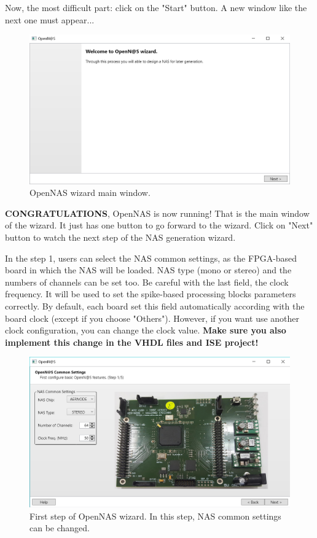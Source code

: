 Now, the most difficult part: click on the "Start" button. A new window like the next one must appear...

\begin{figure}[H]
\centering
\includegraphics[width=1\textwidth]{images/Img13_VS_Init_App.PNG}
\caption{\label{fig:OpenNAS_Wizard_Welcome}OpenNAS wizard main window.}
\end{figure}

\textbf{CONGRATULATIONS}, OpenNAS is now running! That is the main window of the wizard. It just has one button to go forward to the wizard. Click on "Next" button to watch the next step of the NAS generation wizard.

In the step 1, users can select the NAS common settings, as the FPGA-based board in which the NAS will be loaded. NAS type (mono or stereo) and the numbers of channels can be set too. Be careful with the last field, the clock frequency. It will be used to set the spike-based processing blocks parameters correctly. By default, each board set this field automatically according with the board clock (except if you choose "Others"). However, if you want use another clock configuration, you can change the clock value. \textbf{Make sure you also implement this change in the VHDL files and ISE project!}

\begin{figure}[H]
\centering
\includegraphics[width=1\textwidth]{images/Img14_VS_Step1.PNG}
\caption{\label{fig:OpenNAS_common_settings}First step of OpenNAS wizard. In this step, NAS common settings can be changed.}
\end{figure}

